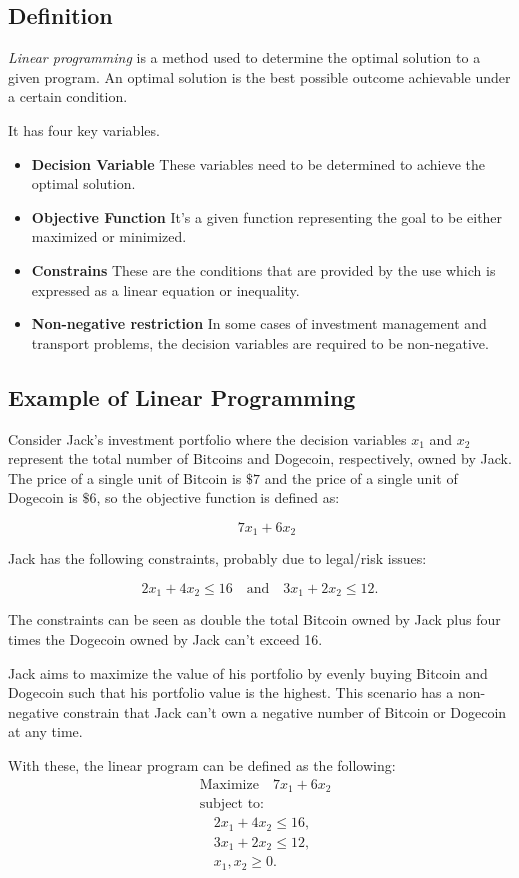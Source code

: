 \subsection{Definition}
\emph{Linear programming} is a method used to determine the optimal solution to a given program. An optimal solution is the best possible outcome achievable under a certain condition.  

It has four key variables. 
\begin{itemize}
\item \textbf{Decision Variable} These variables need to be determined to achieve the optimal solution.
\item \textbf{Objective Function} It's a given function representing the goal to be either maximized or minimized.
\item \textbf{Constrains} These are the conditions that are provided by the use which is expressed as a linear equation or inequality.
\item \textbf{Non-negative restriction} In some cases of investment management and transport problems, the decision variables are required to be non-negative.
\end{itemize}

\subsection{Example of Linear Programming}
Consider Jack's investment portfolio where the decision variables \(x_1\) and \(x_2\) represent the total number of Bitcoins and Dogecoin, respectively, owned by Jack. The price of a single unit of Bitcoin is \(\$7\) and the price of a single unit of Dogecoin is \(\$6\), so the objective function is defined as:

\[
\quad 7x_1 + 6x_2
\]

Jack has the following constraints, probably due to legal/risk issues:

\[
2x_1 + 4x_2 \leq 16 \quad \text{and} \quad 3x_1 + 2x_2 \leq 12.
\]

The constraints can be seen as double the total Bitcoin owned by Jack plus four times the Dogecoin owned by Jack can't exceed 16.

Jack aims to maximize the value of his portfolio by evenly buying Bitcoin and Dogecoin such that his portfolio value is the highest. This scenario has a non-negative constrain that Jack can't own a negative number of Bitcoin or Dogecoin at any time.

With these, the linear program can be defined as the following:
\[
\begin{aligned}
    &\text{Maximize} \quad 7x_1 + 6x_2 \\
    &\text{subject to:} \\
    &\quad 2x_1 + 4x_2 \leq 16, \\
    &\quad 3x_1 + 2x_2 \leq 12, \\
    &\quad x_1, x_2 \geq 0.
\end{aligned}
\]

